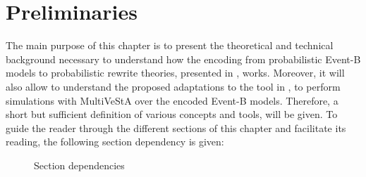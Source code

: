\chapter{Preliminaries}
The main purpose of this chapter is to present the theoretical and technical background necessary to understand how the encoding from probabilistic Event-B models to probabilistic rewrite theories, presented in \cite{Olarte}, works. Moreover, it will also allow to understand the proposed adaptations to the tool in \cite{tool.website}, to perform simulations with MultiVeStA over the encoded Event-B models. Therefore, a short but sufficient definition of various concepts and tools, will be given. To guide the reader through the different sections of this chapter and facilitate its reading, the following section dependency is given:

\begin{figure}[H]
    \centering
    \caption{Section dependencies}
    \label{fig:sectionDependency}
\end{figure}

